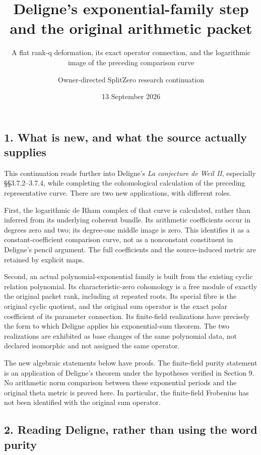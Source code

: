 \documentclass[
  11pt,
]{article}
\title{Deligne's exponential-family step and the original arithmetic
packet}
\subtitle{A flat rank-q deformation, its exact operator connection, and
the logarithmic image of the preceding comparison curve}
\author{Owner-directed SplitZero research continuation}
\date{13 September 2026}
\begin{document}
\maketitle

\subsection{1. What is new, and what the source actually
supplies}\label{what-is-new-and-what-the-source-actually-supplies}

This continuation reads further into Deligne's \emph{La conjecture de
Weil II}, especially §§3.7.2--3.7.4, while completing the cohomological
calculation of the preceding representative curve. There are two new
applications, with different roles.

First, the logarithmic de Rham complex of that curve is calculated,
rather than inferred from its underlying coherent bundle. Its arithmetic
coefficients occur in degrees zero and two; its degree-one middle image
is zero. This identifies it as a constant-coefficient comparison curve,
not as a nonconstant constituent in Deligne's pencil argument. The full
coefficients and the source-induced metric are retained by explicit
maps.

Second, an actual polynomial-exponential family is built from the
existing cyclic relation polynomial. Its characteristic-zero cohomology
is a free module of exactly the original packet rank, including at
repeated roots. Its special fibre is the original cyclic quotient, and
the original sum operator is the exact polar coefficient of its
parameter connection. Its finite-field realizations have precisely the
form to which Deligne applies his exponential-sum theorem. The two
realizations are exhibited as base changes of the same polynomial data,
not declared isomorphic and not assigned the same operator.

The new algebraic statements below have proofs. The finite-field purity
statement is an application of Deligne's theorem under the hypotheses
verified in Section 9. No arithmetic norm comparison between these
exponential periods and the original theta metric is proved here. In
particular, the finite-field Frobenius has not been identified with the
original sum operator.

\subsection{2. Reading Deligne, rather than using the word
purity}\label{reading-deligne-rather-than-using-the-word-purity}
\end{document}
